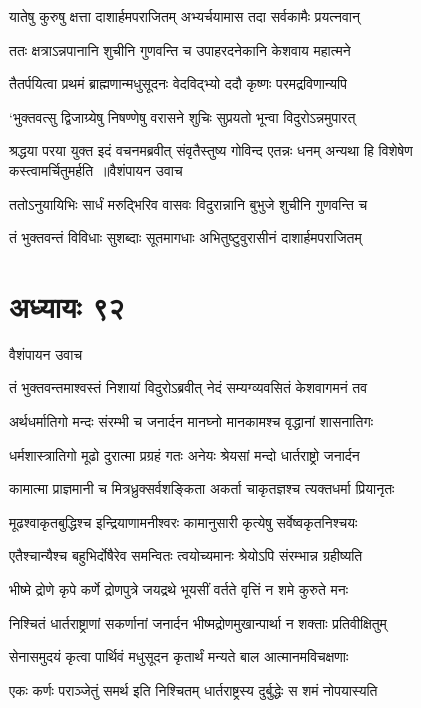 \twolineshloka
{यातेषु कुरुषु क्षत्ता दाशार्हमपराजितम्}
{अभ्यर्चयामास तदा सर्वकामैः प्रयत्नवान्}


\twolineshloka
{ततः क्षत्राऽन्नपानानि शुचीनि गुणवन्ति च}
{उपाहरदनेकानि केशवाय महात्मने}


\twolineshloka
{तैतर्पयित्वा प्रथमं ब्राह्मणान्मधुसूदनः}
{वेदविद्भ्यो ददौ कृष्णः परमद्रविणान्यपि}


\twolineshloka
{`भुक्तवत्सु द्विजाग्र्येषु निषण्णेषु वरासने}
{शुचिः सुप्रयतो भून्वा विदुरोऽन्नमुपारत्}


\fourlineindentedshloka
{श्रद्धया परया युक्त इदं वचनमब्रवीत्}
{संवृतैस्तुष्य गोविन्द एतन्नः धनम्}
{अन्यथा हि विशेषेण कस्त्वामर्चितुमर्हति ॥वैशंपायन उवाच}
{}


\twolineshloka
{ततोऽनुयायिभिः सार्धं मरुद्भिरिव वासवः}
{विदुरान्नानि बुभुजे शुचीनि गुणवन्ति च}


\twolineshloka
{तं भुक्तवन्तं विविधाः सुशब्दाः सूतमागधाः}
{अभितुष्टुवुरासीनं दाशार्हमपराजितम्}


\chapter{अध्यायः ९२}
\twolineshloka
{वैशंपायन उवाच}
{}


\twolineshloka
{तं भुक्तवन्तमाश्वस्तं निशायां विदुरोऽब्रवीत्}
{नेदं सम्यग्व्यवसितं केशवागमनं तव}


\twolineshloka
{अर्थधर्मातिगो मन्दः संरम्भी च जनार्दन}
{मानघ्नो मानकामश्च वृद्धानां शासनातिगः}


\twolineshloka
{धर्मशास्त्रातिगो मूढो दुरात्मा प्रग्रहं गतः}
{अनेयः श्रेयसां मन्दो धार्तराष्ट्रो जनार्दन}


\twolineshloka
{कामात्मा प्राज्ञमानी च मित्रध्रुक्सर्वशङ्किता}
{अकर्ता चाकृतज्ञश्च त्यक्तधर्मा प्रियानृतः}


\twolineshloka
{मूढश्वाकृतबुद्धिश्च इन्द्रियाणामनीश्वरः}
{कामानुसारी कृत्येषु सर्वेष्वकृतनिश्चयः}


\twolineshloka
{एतैश्चान्यैश्च बहुभिर्दोषैरेव समन्वितः}
{त्वयोच्यमानः श्रेयोऽपि संरम्भान्न ग्रहीष्यति}


\twolineshloka
{भीष्मे द्रोणे कृपे कर्णे द्रोणपुत्रे जयद्रथे}
{भूयसीं वर्तते वृत्तिं न शमे कुरुते मनः}


\twolineshloka
{निश्चितं धार्तराष्ट्राणां सकर्णानां जनार्दन}
{भीष्मद्रोणमुखान्पार्था न शक्ताः प्रतिवीक्षितुम्}


\twolineshloka
{सेनासमुदयं कृत्वा पार्थिवं मधुसूदन}
{कृतार्थं मन्यते बाल आत्मानमविचक्षणाः}


\twolineshloka
{एकः कर्णः पराञ्जेतुं समर्थ इति निश्चितम्}
{धार्तराष्ट्रस्य दुर्बुद्धेः स शमं नोपयास्यति}


